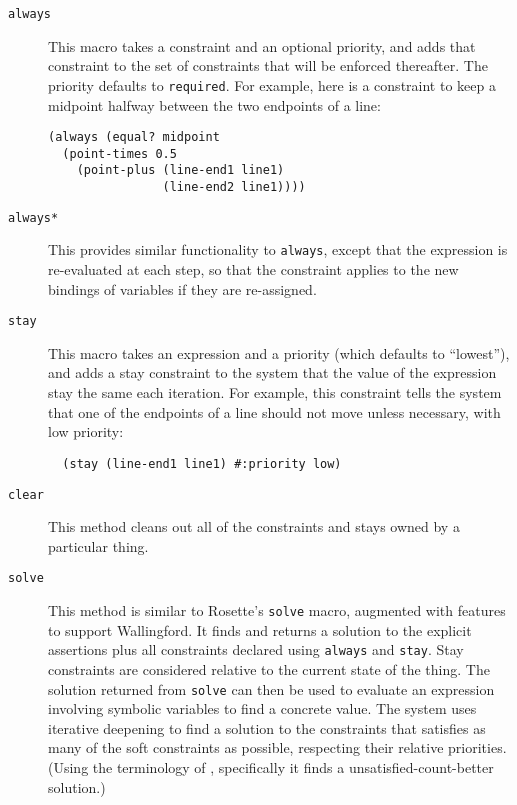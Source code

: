 \documentclass[reprint]{sigplanconf}
\begin{document}
\begin{description}

\item[{\tt always}] This macro takes a constraint and an optional
  priority, and adds that constraint to the set of constraints that will be
  enforced thereafter.  The priority defaults to {\tt required}.  For
  example, here is a constraint to keep a midpoint halfway between the two
  endpoints of a line:

\begin{verbatim}
(always (equal? midpoint 
  (point-times 0.5
    (point-plus (line-end1 line1)
                (line-end2 line1))))
\end{verbatim}

\item[{\tt always*}] This provides similar functionality to
  \verb|always|, except that the expression is re-evaluated at each
  step, so that the constraint applies to the new bindings of
  variables if they are re-assigned.

\item[{\tt stay}] This macro takes an expression and a priority (which
  defaults to ``lowest''), and adds a stay constraint to the system that
  the value of the expression stay the same each iteration.  For example,
  this constraint tells the system that one of the endpoints of a line
  should not move unless necessary, with low priority:

  \begin{verbatim}
  (stay (line-end1 line1) #:priority low)
  \end{verbatim}

\item[{\tt clear}]  This method cleans out all of the constraints
  and stays owned by a particular thing.

\item[{\tt solve}] This method is similar to Rosette's {\tt solve}
  macro, augmented with features to support Wallingford.  It finds and
  returns a solution to the explicit assertions plus all constraints
  declared using \verb|always| and \verb|stay|.  Stay constraints are
  considered relative to the current state of the thing.  The solution
  returned from {\tt solve} can then be used to evaluate an
  expression involving symbolic variables to find a concrete value.  The
  system uses iterative deepening to find a solution to the constraints
  that satisfies as many of the soft constraints as possible, respecting
  their relative priorities.  (Using the terminology of
  \cite{borning-lisp-symbolic-computation-1992}, specifically it finds a
  unsatisfied-count-better solution.)

\end{description}
\end{document}
